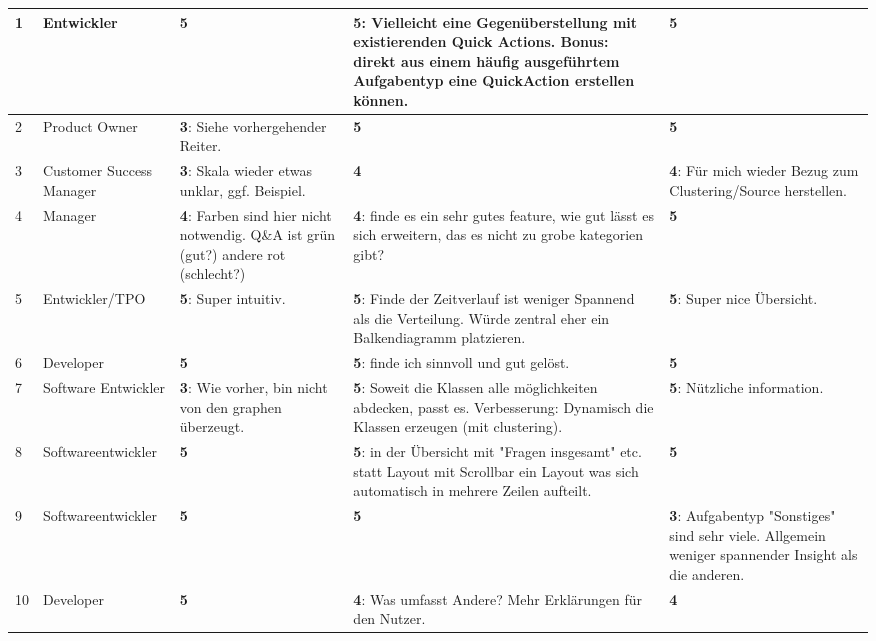 \documentclass[
	english,
	ruledheaders=section,%
	class=report,%
	thesis={type=bachelor},%
	accentcolor=1b,%
	custommargins=true,%
	marginpar=false,%
	parskip=half-,%
	fontsize=11pt,%
	DIV=14,
]{tudapub}
\begin{document}
\begin{longtable}{l >{\RaggedRight}p{3cm} >{\RaggedRight}p{3.5cm} >{\RaggedRight}p{3.5cm} >{\RaggedRight}p{3.5cm}}
    1 & Entwickler & \textbf{5} & \textbf{5}: Vielleicht eine Gegenüberstellung mit existierenden Quick Actions. Bonus: direkt aus einem häufig ausgeführtem Aufgabentyp eine QuickAction erstellen können. & \textbf{5} \\
    \midrule
    2 & Product Owner & \textbf{3}: Siehe vorhergehender Reiter. & \textbf{5} & \textbf{5} \\
    \midrule
    3 & Customer Success Manager & \textbf{3}: Skala wieder etwas unklar, ggf. Beispiel. & \textbf{4} & \textbf{4}: Für mich wieder Bezug zum Clustering/Source herstellen. \\
    \midrule
    4 & Manager & \textbf{4}: Farben sind hier nicht notwendig. Q\&A ist grün (gut?) andere rot (schlecht?) & \textbf{4}: finde es ein sehr gutes feature, wie gut lässt es sich erweitern, das es nicht zu grobe kategorien gibt? & \textbf{5} \\
    \midrule
    5 & Entwickler/TPO & \textbf{5}: Super intuitiv. & \textbf{5}: Finde der Zeitverlauf ist weniger Spannend als die Verteilung. Würde zentral eher ein Balkendiagramm platzieren. & \textbf{5}: Super nice Übersicht. \\
    \midrule
    6 & Developer & \textbf{5} & \textbf{5}: finde ich sinnvoll und gut gelöst. & \textbf{5} \\
    \midrule
    7 & Software Entwickler & \textbf{3}: Wie vorher, bin nicht von den graphen überzeugt. & \textbf{5}: Soweit die Klassen alle möglichkeiten abdecken, passt es. Verbesserung: Dynamisch die Klassen erzeugen (mit clustering). & \textbf{5}: Nützliche information. \\
    \midrule
    8 & Softwareentwickler & \textbf{5} & \textbf{5}: in der Übersicht mit "Fragen insgesamt" etc. statt Layout mit Scrollbar ein Layout was sich automatisch in mehrere Zeilen aufteilt. & \textbf{5} \\
    \midrule
    9 & Softwareentwickler & \textbf{5} & \textbf{5} & \textbf{3}: Aufgabentyp "Sonstiges" sind sehr viele. Allgemein weniger spannender Insight als die anderen. \\
    \midrule
    10 & Developer & \textbf{5} & \textbf{4}: Was umfasst Andere? Mehr Erklärungen für den Nutzer. & \textbf{4} \\
\end{longtable}

\clearpage
\end{document}
